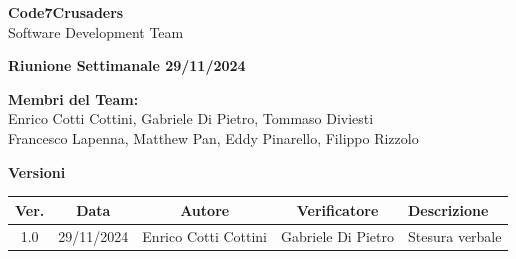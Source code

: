 \documentclass{article}
\begin{document}
\begin{titlepage}
    {\Huge \textbf{Code7Crusaders}}\\
    \vspace{0.5cm}
    {\Large Software Development Team}\\
    \vspace{2cm}
    
    {\large \textbf{Riunione Settimanale 29/11/2024}}\\ 
    \vspace{5cm}                           
    
    
    \textbf{Membri del Team:}\\
    Enrico Cotti Cottini, Gabriele Di Pietro, Tommaso Diviesti \\
    Francesco Lapenna, Matthew Pan, Eddy Pinarello, Filippo Rizzolo \\
    \vspace{0.5cm}
    
    \vspace{1cm}
\end{titlepage}



\newpage
\begin{table}[h!]
\centering
\textbf{Versioni} \\ %
\vspace{2mm} %
\begin{tabular}{|c|c|c|c|>{\raggedright\arraybackslash}p{}|}
    \hline
    \textbf{Ver.} & \textbf{Data} & \textbf{Autore} & \textbf{Verificatore} & \textbf{Descrizione} \\
    \hline
    1.0 & 29/11/2024 & Enrico Cotti Cottini & Gabriele Di Pietro & Stesura verbale \\ 
    \hline                                  
\end{tabular}
\end{table}



\newpage
\tableofcontents



\newpage
\end{document}
